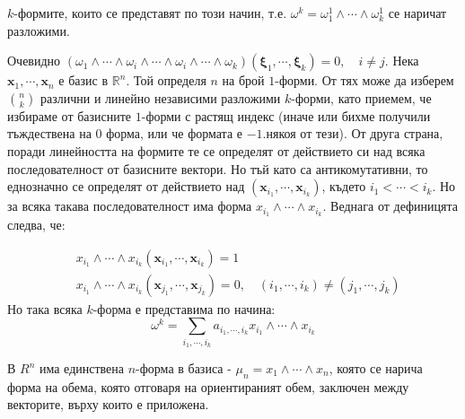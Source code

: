 \documentclass[12pt]{article}
\newcommand\myxi[0]{\boldsymbol{\xi}}
\begin{document}
\begin{large}
$k$-формите, които се представят по този начин, т.е. $\omega^k=\omega^1_1 \wedge \cdots \wedge \omega^1_k$ се наричат разложими.

Очевидно $(\omega_1 \wedge \cdots \wedge \omega_i \wedge \cdots \wedge \omega_i \wedge \cdots \wedge \omega_k)(\myxi_1,\cdots,\myxi_k)=0, \quad i \neq j$. 
Нека $\mathbf{x}_1,\cdots ,\mathbf{x}_n$ е базис в $\mathbb{R}^n$. Той определя $n$ на брой $1$-форми. От тях може да изберем $n \choose k$ различни и линейно независими разложими $k$-форми, като приемем, че избираме от базисните $1$-форми с растящ индекс (иначе или бихме получили тъждествена на $0$ форма, или че формата е $-1.$някоя от тези).
От друга страна, поради линейността на формите те се определят от действието си над всяка последователност от базисните вектори. Но тъй като са антикомутативни, то еднозначно се определят от действието над $(\mathbf{x}_{i_1}, \cdots, \mathbf{x}_{i_k})$, където $i_1<\cdots<i_k$. Но за всяка такава последователност има форма $x_{i_1} \wedge \cdots \wedge x_{i_k}$. Веднага от дефиницята следва, че:
\begin{comment} b_{i_1,\cdots,i_k} \quad (\textbf{при евклидова структура $b_{i_1,\cdots,i_k}=1$}) 
\end{comment}
\begin{align*}
&x_{i_1} \wedge \cdots \wedge x_{i_k}(\mathbf{x}_{i_1}, \cdots, \mathbf{x}_{i_k}) = 1  \\
&x_{i_1} \wedge \cdots \wedge x_{i_k}(\mathbf{x}_{j_1}, \cdots, \mathbf{x}_{j_k}) = 0, \quad (i_1,\cdots,i_k)\neq(j_1,\cdots,j_k)
\end{align*}
Но така всяка $k$-форма е представима по начина:
\[
\omega^k = \sum_{i_1,\cdots,i_k} a_{i_1,\cdots,i_k} x_{i_1} \wedge \cdots \wedge x_{i_k}
\]

В $R^n$ има единствена $n$-форма в базиса - $\mu_n = x_1 \wedge \cdots \wedge x_n$, която се нарича форма на обема, която отговаря на ориентираният обем, заключен между векторите, върху които е приложена. \\ 


\end{large}
\end{document}
